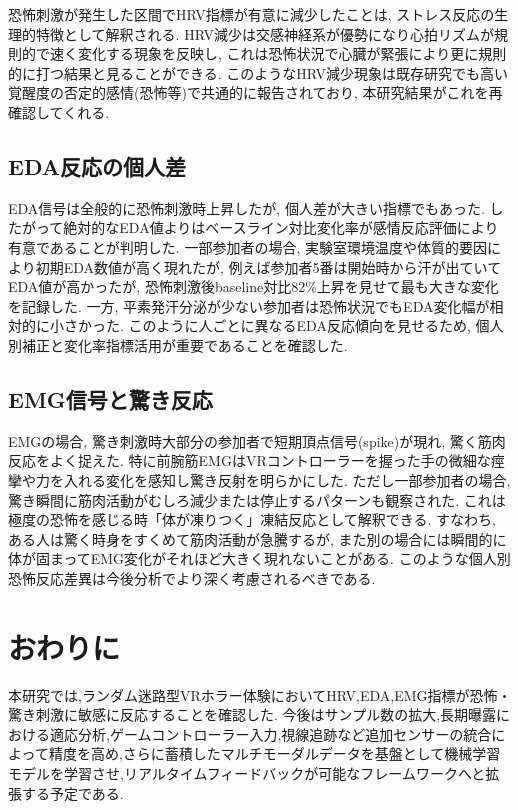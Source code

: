 \documentclass[a4paper]{jarticle}
\begin{document}
恐怖刺激が発生した区間でHRV指標が有意に減少したことは, ストレス反応の生理的特徴として解釈される. HRV減少は交感神経系が優勢になり心拍リズムが規則的で速く変化する現象を反映し, これは恐怖状況で心臓が緊張により更に規則的に打つ結果と見ることができる. このようなHRV減少現象は既存研究\cite{bib13}でも高い覚醒度の否定的感情(恐怖等)で共通的に報告されており, 本研究結果がこれを再確認してくれる.

\subsection{EDA反応の個人差}

EDA信号は全般的に恐怖刺激時上昇したが, 個人差が大きい指標でもあった. したがって絶対的なEDA値よりはベースライン対比変化率が感情反応評価により有意であることが判明した. 一部参加者の場合, 実験室環境温度や体質的要因により初期EDA数値が高く現れたが, 例えば参加者5番は開始時から汗が出ていてEDA値が高かったが, 恐怖刺激後baseline対比82\%上昇を見せて最も大きな変化を記録した. 一方, 平素発汗分泌が少ない参加者は恐怖状況でもEDA変化幅が相対的に小さかった. このように人ごとに異なるEDA反応傾向を見せるため, 個人別補正と変化率指標活用が重要であることを確認した.

\subsection{EMG信号と驚き反応}

EMGの場合, 驚き刺激時大部分の参加者で短期頂点信号(spike)が現れ, 驚く筋肉反応をよく捉えた. 特に前腕筋EMGはVRコントローラーを握った手の微細な痙攣や力を入れる変化を感知し驚き反射を明らかにした. ただし一部参加者の場合, 驚き瞬間に筋肉活動がむしろ減少または停止するパターンも観察された. これは極度の恐怖を感じる時「体が凍りつく」凍結反応として解釈できる. すなわち, ある人は驚く時身をすくめて筋肉活動が急騰するが, また別の場合には瞬間的に体が固まってEMG変化がそれほど大きく現れないことがある. このような個人別恐怖反応差異は今後分析でより深く考慮されるべきである.

\section{おわりに}%

本研究では,ランダム迷路型VRホラー体験においてHRV,EDA,EMG指標が恐怖・驚き刺激に敏感に反応することを確認した. 今後はサンプル数の拡大,長期曝露における適応分析,ゲームコントローラー入力,視線追跡など追加センサーの統合によって精度を高め,さらに蓄積したマルチモーダルデータを基盤として機械学習モデルを学習させ,リアルタイムフィードバックが可能なフレームワークへと拡張する予定である.
\end{document}
